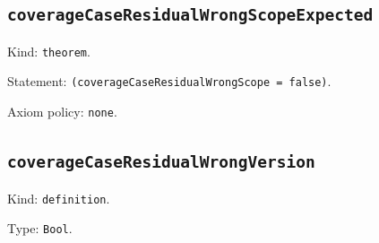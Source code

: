 \documentclass[11pt]{article}
\begin{document}
\subsection*{\texttt{coverageCaseResidualWrongScopeExpected}}
\noindent Kind: \texttt{theorem}.\par
\noindent Statement: \texttt{(coverageCaseResidualWrongScope = false)}.\par
\noindent Axiom policy: \texttt{none}.\par
\subsection*{\texttt{coverageCaseResidualWrongVersion}}
\noindent Kind: \texttt{definition}.\par
\noindent Type: \texttt{Bool}.\par
\end{document}
